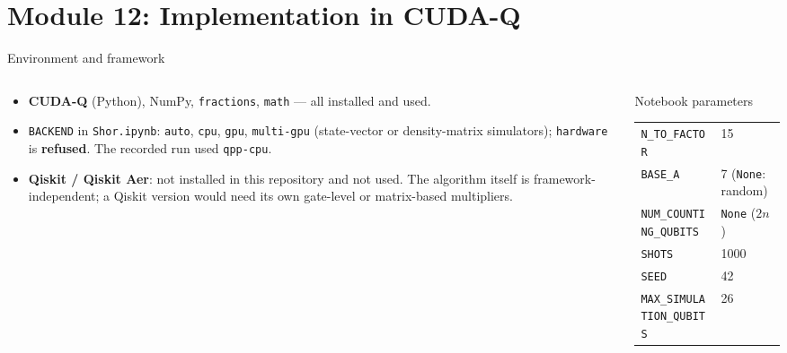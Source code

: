 \documentclass[aspectratio=169,11pt]{beamer}
\newcommand{\hl}[1]{{\color{qorange}\textbf{#1}}}
\newcommand{\key}[1]{{\color{qdark}\textbf{#1}}}
\begin{document}
\section{Module 12: Implementation in CUDA-Q}
\begin{frame}[label=fEnv]{Environment and framework}
  \begin{columns}[T]
    \begin{column}{0.52\textwidth}
      \small
      \begin{itemize}\itemsep2pt
        \item \key{CUDA-Q} \numcudaqversion{} (Python), NumPy, \texttt{fractions}, \texttt{math} --- all installed and used.
        \item \texttt{BACKEND} in \texttt{Shor.ipynb}: \texttt{auto}, \texttt{cpu}, \texttt{gpu}, \texttt{multi-gpu} (state-vector or density-matrix simulators); \texttt{hardware} is \hl{refused}. The recorded run used \texttt{qpp-cpu}.
        \item \key{Qiskit / Qiskit Aer}: not installed in this repository and not used. The algorithm itself is framework-independent; a Qiskit version would need its own
              gate-level or matrix-based multipliers.
      \end{itemize}
    \end{column}
    \begin{column}{0.44\textwidth}
      \begin{block}{Notebook parameters}
        \scriptsize
        \begin{tabular}{@{}ll@{}}
          \texttt{N\_TO\_FACTOR} & 15\\
          \texttt{BASE\_A} & 7 (\texttt{None}: random)\\
          \texttt{NUM\_COUNTING\_QUBITS} & \texttt{None} ($2n$)\\
          \texttt{SHOTS} & 1000\\
          \texttt{SEED} & 42\\
          \texttt{MAX\_SIMULATION\_QUBITS} & 26
        \end{tabular}
      \end{block}
    \end{column}
  \end{columns}
\end{frame}
\end{document}
